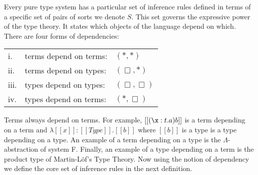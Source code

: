 Every pure type system has a particular set of inference rules defined
in terms of a specific set of pairs of sorts we denote $S$.  This set
governs the expressive power of the type theory.  It states which
objects of the language depend on which. There are four forms of
dependencies:
\begin{center}
  \begin{tabular}{lll}
    i.   & terms depend on terms: & $(*,*)$\\
    ii.  & terms depend on types: & $(\Box,*)$\\
    iii. & types depend on types: & $(\Box,\Box)$\\
    iv.  & types depend on terms: & $(*,\Box)$
  \end{tabular}  
\end{center}
Terms always depend on terms. For example, $[[(\x:t.a) b]]$ is a term
depending on a term and $\lambda [[x]]:[[Type]].[[b]]$ where $[[b]]$ is a type is
a type depending on a type.  An example of a term depending on a type
is the $\Lambda$-abstraction of system F.  Finally, an example of a
type depending on a term is the product type of Martin-L\"of's Type
Theory.  Now using the notion of dependency we define the core set of
inference rules in the next definition.
